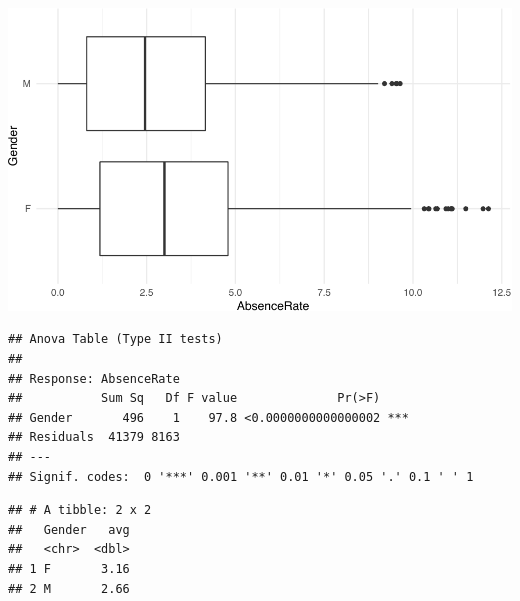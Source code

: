 \documentclass[12pt, krantz2,]{krantz}
\makeatletter
\newenvironment{Shaded}{\begin{snugshade}}{\end{snugshade}}
\newcommand{\CommentTok}[1]{\textcolor[rgb]{0.37,0.37,0.37}{\textit{#1}}}
\newcommand{\DataTypeTok}[1]{\textcolor[rgb]{0.27,0.27,0.27}{#1}}
\newcommand{\FloatTok}[1]{\textcolor[rgb]{0.06,0.06,0.06}{#1}}
\newcommand{\KeywordTok}[1]{\textcolor[rgb]{0.27,0.27,0.27}{\textbf{#1}}}
\newcommand{\NormalTok}[1]{#1}
\newcommand{\OperatorTok}[1]{\textcolor[rgb]{0.43,0.43,0.43}{\textbf{#1}}}
\newcommand{\StringTok}[1]{\textcolor[rgb]{0.5,0.5,0.5}{#1}}
\newenvironment{kframe}{%
\medskip{}
\setlength{\fboxsep}{.8em}
 \def\at@end@of@kframe{}%
 \ifinner\ifhmode%
  \def\at@end@of@kframe{\end{minipage}}%
  \begin{minipage}{\columnwidth}%
 \fi\fi%
 \def\FrameCommand##1{\hskip\@totalleftmargin \hskip-\fboxsep
 \colorbox{shadecolor}{##1}\hskip-\fboxsep
     \hskip-\linewidth \hskip-\@totalleftmargin \hskip\columnwidth}%
 \MakeFramed {\advance\hsize-\width
   \@totalleftmargin\z@ \linewidth\hsize
   \@setminipage}}%
 {\par\unskip\endMakeFramed%
 \at@end@of@kframe}
\renewenvironment{Shaded}{\begin{kframe}}{\end{kframe}}
\makeatother
\begin{document}
\includegraphics[width=\textwidth]{hendrikfeddersen_files/figure-latex/unnamed-chunk-9-1}

\begin{Shaded}
\end{Shaded}

\begin{verbatim}
## Anova Table (Type II tests)
## 
## Response: AbsenceRate
##           Sum Sq   Df F value              Pr(>F)    
## Gender       496    1    97.8 <0.0000000000000002 ***
## Residuals  41379 8163                                
## ---
## Signif. codes:  0 '***' 0.001 '**' 0.01 '*' 0.05 '.' 0.1 ' ' 1
\end{verbatim}

\begin{Shaded}
\end{Shaded}

\begin{verbatim}
## # A tibble: 2 x 2
##   Gender   avg
##   <chr>  <dbl>
## 1 F       3.16
## 2 M       2.66
\end{verbatim}
\end{document}
